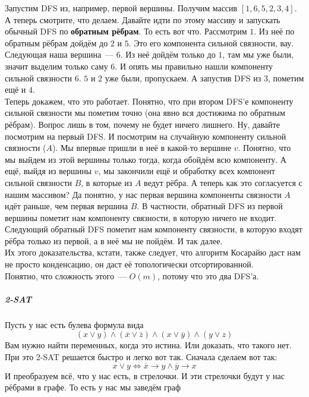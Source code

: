 \documentclass{article}
\begin{document}
    Запустим DFS из, например, первой вершины. Получим массив $[1,6,5,2,3,4]$. А теперь смотрите, что делаем. Давайте идти по этому массиву и запускать обычный DFS по \textbf{обратным рёбрам}. То есть вот что. Рассмотрим $1$. Из неё по обратным рёбрам дойдём до $2$ и $5$. Это его компонента сильной связности, вау. Следующая наша вершина~--- $6$. Из неё дойдём только до $1$, там мы уже были, значит выделим только саму $6$. И опять мы правильно нашли компоненту сильной связности $6$. $5$ и $2$ уже были, пропускаем. А запустив DFS из $3$, пометим ещё и $4$.\\
    Теперь докажем, что это работает. Понятно, что при втором DFS'е компоненту сильной связности мы пометим точно (она явно вся достижима по обратным рёбрам). Вопрос лишь в том, почему не будет ничего лишнего. Ну, давайте посмотрим на первый DFS. И посмотрим на случайную компоненту сильной связности ($A$). Мы впервые пришли в неё в какой-то вершине $v$. Понятно, что мы выйдем из этой вершины только тогда, когда обойдём всю компоненту. А ещё, выйдя из вершины $v$, мы закончили ещё и обработку всех компонент сильной связности $B$, в которые из $A$ ведут рёбра.
    А теперь как это согласуется с нашим массивом? Да понятно, у нас первая вершина компоненты связности $A$ идёт раньше, чем первая вершина $B$. В частности, обратный DFS из первой вершины пометит нам компоненту связности, в которую ничего не входит. Следующий обратный DFS пометит нам компоненту связности, в которую входят рёбра только из первой, а в неё мы не пойдём. И так далее.\\
    Их этого доказательства, кстати, также следует, что алгоритм Косарайю даст нам не просто конденсацию, он даст её топологически отсортированной.\\
    Понятно, что сложность этого~--- $O(m)$, потому что это два DFS'а.
    \subparagraph{2-SAT}
    Пусть у нас есть булева формула вида
    $$
    (x\lor y)\land(\overline x\lor\overline z)\land(x\lor\overline y)\land(y\lor z)
    $$
    Вам нужно найти переменных, когда это истина. Или доказать, что такого нет. При это 2-SAT решается быстро и легко вот так. Сначала сделаем вот так:
    $$
    x\lor y\Longleftrightarrow\overline x\to y\land\overline y\to x
    $$
    И преобразуем всё, что у нас есть, в стрелочки. И эти стрелочки будут у нас рёбрами в графе. То есть у нас мы заведём граф
    \begin{figure}[H]
    \end{figure}\noindent
\end{document}
